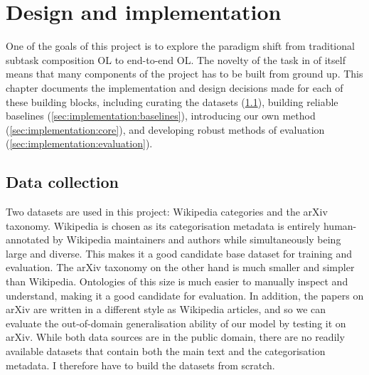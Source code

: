 \chapter{Design and implementation}

One of the goals of this project is to explore the paradigm shift from traditional subtask composition OL to end-to-end OL. The novelty of the task in of itself means that many components of the project has to be built from ground up. This chapter documents the implementation and design decisions made for each of these building blocks, including curating the datasets (\cref{sec:implementation:data-collection}), building reliable baselines (\cref{sec:implementation:baselines}), introducing our own method \name (\cref{sec:implementation:core}), and developing robust methods of evaluation (\cref{sec:implementation:evaluation}).



\section{Data collection}  \label{sec:implementation:data-collection}

Two datasets are used in this project: Wikipedia categories and the arXiv taxonomy. Wikipedia is chosen as its categorisation metadata is entirely human-annotated by Wiki\-pedia maintainers and authors while simultaneously being large and diverse. This makes it a good candidate base dataset for training and evaluation. The arXiv taxonomy on the other hand is much smaller and simpler than Wikipedia. Ontologies of this size is much easier to manually inspect and understand, making it a good candidate for evaluation. In addition, the papers on arXiv are written in a different style as Wikipedia articles, and so we can evaluate the out-of-domain generalisation ability of our model by testing it on arXiv. While both data sources are in the public domain, there are no readily available datasets that contain both the main text and the categorisation metadata. I therefore have to build the datasets from scratch.

